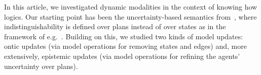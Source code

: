 \begin{comment}
In this paper we investigated dynamic modalities in the context of \emph{knowing how} logics. Our starting point has been the uncertainty-based semantics from~\cite{AFSVQ21,AFSVQ23report}. 
Building on this, we studied two forms of updates: ontic updates, via annoucement-like and arrow-update-like modalities; and epistemic updates, refining the perception of an agent regarding her own abilities. For the operators encompassed in the former family, we showed that in their general form, they increase the expressivity of the logic. Moreover, we restricted ourselves to a particular class of models and we provided axiomatizations via reduction axioms. For the latter family, we discussed some preliminary thoughts and semantic properties of each operator, and we discussed some limitations of this setting. Concretely, we showed that the presented logics lack uniform substitution, a typical property that is used to obtain complete axiomatizations. To deal with this issue, we presented an extended, underlying static language, and then proposed some dynamic modalities for epistemic updates. This contribution is completely novel with respect to~\cite{AFSV22}. Here, we presented a modality that makes a single plan  distinguishable from any other from the perspective of the agents. 
In this extended setting, apart from showing how it could be useful for the examples we introduced, we obtained sound and complete axiomatizations via reduction axioms, and showed that the satisfiability problem for these logics is decidable. 
\end{comment}

In this article, we investigated dynamic modalities in the context of knowing how logics. Our starting point has been the uncertainty-based semantics from~\cite{AFSVQ21,AFSVQ23report}, where indistinguishability is defined over plans instead of over states as in the framework of e.g.~\cite{FervariHLW17,LiW24}. 
Building on this, we studied two kinds of model updates: ontic updates (via model operations for removing states and edges) and, more extensively, epistemic updates (via model operations for refining the agents' uncertainty over plans). 


